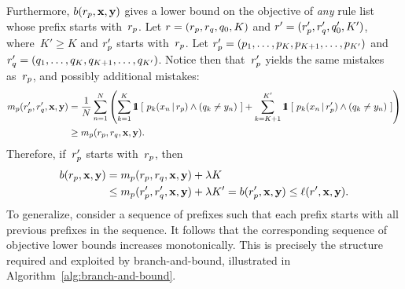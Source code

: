 Furthermore, $b({r_p}, \mathbf{x}, \mathbf{y})$ gives a lower bound on the objective of
\emph{any} rule list whose prefix starts with~${r_p}$.
%
Let ${{r} = ({r_p}, {r}_q, q_0, K)}$ and ${{r}' = ({r'_p}, {r}'_q, q'_0, K')}$,
where~${K' \ge K}$ and ${r'_p}$ starts with~${r_p}$.
%
Let ${{r'_p} = (p_1, \dots, p_K, p_{K+1}, \dots, p_{K'})}$
and ${{r}'_q = (q_1, \dots, q_K, q_{K+1}, \dots, q_{K'})}$.
%
Notice then that~${r'_p}$ yields the same mistakes as~${r_p}$,
and possibly additional mistakes:
\begin{align}
m_p(\PrefixP, \RL'_q, \x, \y)
&= \frac{1}{N} \sum_{n=1}^N \left( \sum_{k=1}^K \eins ~[~ p_k(x_n \given \Prefix) \wedge (q_k \neq y_n) ~]
+ \sum_{k=K+1}^{K'} \eins ~[~ p_k(x_n \given \PrefixP) \wedge (q_k \neq y_n) ~] \right) \nn \\
&\ge m_p(\Prefix, \RL_q, \x, \y).
\end{align}
Therefore, if~${r'_p}$ starts with~${r_p}$, then
\begin{align}
b(\Prefix, \x, \y) &= m_p(\Prefix, \RL_q, \x, \y) + \lambda K \nn \\
&\le  m_p(\PrefixP, \RL'_q, \x, \y) + \lambda K' = b(\PrefixP, \x, \y)
\le \ell(\RL', \x, \y).
\label{eq:prefix-lb}
\end{align}
%
To generalize, consider a sequence of prefixes such that each prefix
starts with all previous prefixes in the sequence.
%
It follows that the corresponding sequence of objective lower bounds
increases monotonically.
%
This is precisely the structure required and exploited by branch-and-bound,
illustrated in Algorithm~\ref{alg:branch-and-bound}.

